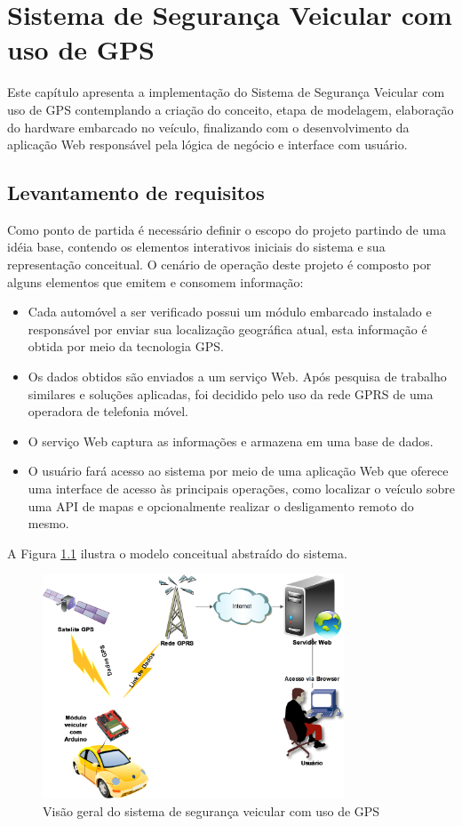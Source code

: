 \chapter{Sistema de Seguran\c{c}a Veicular com uso de GPS}
\label{cap:prototipo do sistema}

Este capítulo apresenta a implementação do Sistema de Segurança Veicular com uso de GPS contemplando a criação do conceito, etapa de modelagem, elaboração do hardware embarcado no veículo, finalizando com o desenvolvimento da aplicação Web responsável pela lógica de negócio e interface com usuário.  

\section{Levantamento de requisitos}
Como ponto de partida é necessário definir o escopo do projeto partindo de uma idéia base, 
contendo os elementos interativos iniciais do sistema e sua representação conceitual. O cenário de operação
deste projeto é composto por alguns elementos que emitem e consomem informação:

\begin{itemize}
	\item Cada automóvel a ser verificado possui um módulo embarcado instalado e responsável por enviar sua 
	localização geográfica atual, esta informação é obtida por meio da tecnologia GPS. 
	\item  Os dados obtidos são enviados a um serviço Web. Após pesquisa de trabalho similares e soluções aplicadas,
	foi decidido pelo uso da rede GPRS de uma operadora de telefonia móvel.
  \item O serviço Web captura as informações e armazena em uma base de dados. 
	\item O usuário fará acesso ao sistema por meio de uma aplicação Web que oferece uma interface 
	de acesso às principais operações, como localizar o veículo sobre uma API de mapas e opcionalmente 
	realizar o desligamento remoto do mesmo. 
\end{itemize}

A Figura \ref{fig:visgeral} ilustra o modelo conceitual abstraído do sistema.

\begin{figure}[!htb]
\centering
\includegraphics[width=0.8\textwidth]{figures/1_conceitual.png}
\caption{Visão geral do sistema de seguran\c{c}a veicular com uso de GPS}
\label{fig:visgeral}
\end{figure}

